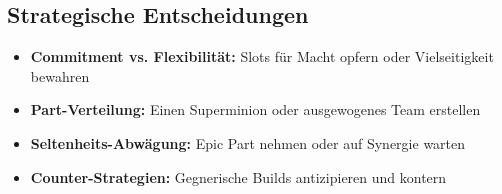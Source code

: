\subsection{Strategische Entscheidungen}
\begin{itemize}
    \item \textbf{Commitment vs. Flexibilität:} Slots für Macht opfern oder Vielseitigkeit bewahren
    \item \textbf{Part-Verteilung:} Einen Superminion oder ausgewogenes Team erstellen
    \item \textbf{Seltenheits-Abwägung:} Epic Part nehmen oder auf Synergie warten
    \item \textbf{Counter-Strategien:} Gegnerische Builds antizipieren und kontern
\end{itemize}
